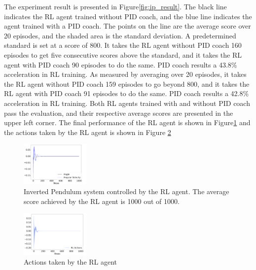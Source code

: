 \documentclass[AMS,STIX1COL]{WileyNJD-v2}
\begin{document}
The experiment result is presented in Figure\ref{fig:ip_result}. The black line indicates the RL agent trained without PID coach, and the blue line indicates the agent trained with a PID coach. The points on the line are the average score over 20 episodes, and the shaded area is the standard deviation. A predetermined standard is set at a score of 800. It takes the RL agent without PID coach 160 episodes to get five consecutive scores above the standard, and it takes the RL agent with PID coach 90 episodes to do the same. PID coach results a 43.8\% acceleration in RL training. As measured by averaging over 20 episodes, it takes the RL agent without PID coach 159 episodes to go beyond 800, and it takes the RL agent with PID coach 91 episodes to do the same. PID coach results a 42.8\% acceleration in RL training. Both RL agents trained with and without PID coach pass the evaluation, and their respective average scores are presented in the upper left corner. The final performance of the RL agent is shown in Figure\ref{fig:ip_rl} and the actions taken by the RL agent is shown in Figure \ref{fig:ip_rl_actions}

\begin{figure}
\centering
\includegraphics[width=0.3\textwidth]{ip_RL.png}
\caption{Inverted Pendulum system controlled by the RL agent. The average score achieved by the RL agent is 1000 out of 1000.}
\label{fig:ip_rl}
\end{figure}%

\begin{figure}
\centering
\includegraphics[width=0.3\textwidth]{ip_RL_actions.png}
\caption{Actions taken by the RL agent}
\label{fig:ip_rl_actions}
\end{figure}
\end{document}
